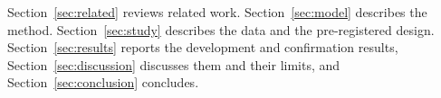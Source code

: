 Section~\ref{sec:related} reviews related work. Section~\ref{sec:model} describes the method. Section~\ref{sec:study} describes the data and the pre-registered design. Section~\ref{sec:results} reports the development and confirmation results, Section~\ref{sec:discussion} discusses them and their limits, and Section~\ref{sec:conclusion} concludes.
